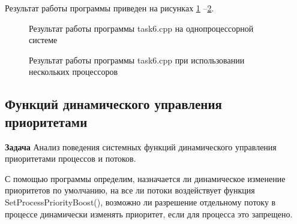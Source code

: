 \documentclass[a4paper]{article}
\begin{document}
	Результат работы программы приведен на рисунках \ref{img:task6} --\ref{img:task6_2}.
	\begin{figure}[h!]
		\caption{Результат работы программы task6.cpp на однопроцессорной системе}
		\label{img:task6}
	\end{figure}
	
	\begin{figure}[h!]
		\caption{Результат работы программы task6.cpp при использовании нескольких процессоров}
		\label{img:task6_2}
	\end{figure}
	
\subsection{Функций динамического управления приоритетами}
	\textbf{Задача} Анализ поведения системных функций динамического управления приоритетами процессов и потоков.
	
	С помощью программы определим, назначается ли динамическое изменение приоритетов по умолчанию, на все ли потоки воздействует функция SetProcessPriorityBoost(), возможно ли разрешение отдельному потоку в процессе динамически изменять приоритет, если для процесса это запрещено.
	
\end{document}
